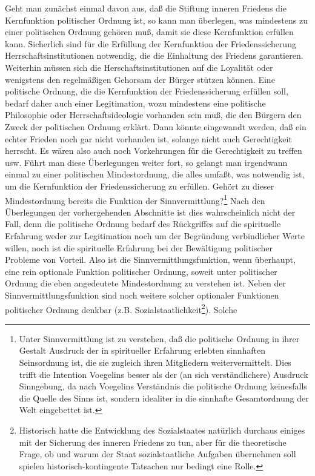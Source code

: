 Geht man zunächst einmal davon aus, daß die Stiftung inneren Friedens die
Kernfunktion politischer Ordnung ist, so kann man überlegen, was mindestens zu
einer politischen Ordnung gehören muß, damit sie diese Kernfunktion erfüllen
kann. Sicherlich sind für die Erfüllung der Kernfunktion der Friedenssicherung
Herrschaftsinstitutionen notwendig, die die Einhaltung des Friedens
garantieren. Weiterhin müssen sich die Herschaftsinstitutionen auf die
Loyalität oder wenigstens den regelmäßigen Gehorsam der Bürger stützen können.
Eine politische Ordnung, die die Kernfunktion der Friedenssicherung erfüllen
soll, bedarf daher auch einer Legitimation, wozu mindestens eine politische
Philosophie oder Herrschaftsideologie vorhanden sein muß, die den Bürgern den
Zweck der politischen Ordnung erklärt. Dann könnte eingewandt werden, daß ein
echter Frieden noch gar nicht vorhanden ist, solange nicht auch Gerechtigkeit
herrscht. Es wären also auch noch Vorkehrungen für die Gerechtigkeit zu
treffen usw. Führt man diese Überlegungen weiter fort, so gelangt man
irgendwann einmal zu einer politischen Mindestordnung, die alles umfaßt, was
notwendig ist, um die Kernfunktion der Friedenssicherung zu erfüllen. Gehört
zu dieser Mindestordnung bereits die Funktion der
Sinnvermittlung?\footnote{Unter Sinnvermittlung ist zu verstehen, daß die
  politische Ordnung in ihrer Gestalt Ausdruck der in spiritueller Erfahrung
  erlebten sinnhaften Seinsordnung ist, die sie zugleich ihren Mitgliedern
  weitervermittelt. Dies trifft die Intention Voegelins besser als der (an
  sich verständlichere) Ausdruck Sinngebung, da nach Voegelins Verständnis die
  politische Ordnung keinesfalls die Quelle des Sinns ist, sondern idealiter
  in die sinnhafte Gesamtordnung der Welt eingebettet ist.} Nach den
Überlegungen der vorhergehenden Abschnitte ist dies wahrscheinlich nicht der
Fall, denn die politische Ordnung bedarf des Rückgriffes auf die spirituelle
Erfahrung weder zur Legitimation noch um der Begründung verbindlicher Werte
willen, noch ist die spirituelle Erfahrung bei der Bewältigung politischer
Probleme von Vorteil. Also ist die Sinnvermittlungsfunktion, wenn überhaupt,
eine rein optionale Funktion politischer Ordnung, soweit unter politischer
Ordnung die eben angedeutete Mindestordnung zu verstehen ist. Neben der
Sinnvermittlungsfunktion sind noch weitere solcher optionaler Funktionen
politischer Ordnung denkbar (z.B. Sozialstaatlichkeit\footnote{Historisch
  hatte die Entwicklung des Sozialstaates natürlich durchaus einiges mit der
  Sicherung des inneren Friedens zu tun, aber für die theoretische Frage, ob
  und warum der Staat sozialstaatliche Aufgaben übernehmen soll spielen
  historisch-kontingente Tatsachen nur bedingt eine Rolle.}). Solche
